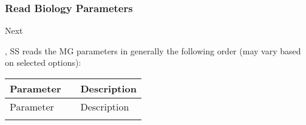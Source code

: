\subsubsection{Read Biology Parameters}
\hypertarget{MGorder}{Next}, SS reads the MG parameters in generally the following order (may vary based on selected options):

\begin{center}
	\begin{longtable}{p{1cm} p{2.5cm} p{10cm}}

		Parameter& & Description\\
		\hline
		\endfirsthead

		Parameter& & Description\\
		\hline
		\endhead

		\endfoot

		\endlastfoot


\end{longtable}
\end{center}
